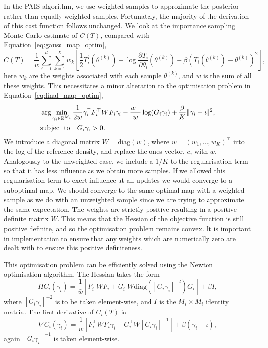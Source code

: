 \documentclass[final]{siamltex}
\begin{document}
In the PAIS algorithm, we use weighted samples to approximate the posterior rather than equally weighted samples. Fortunately, the majority of the derivation of this cost function follows unchanged. We look at the importance sampling Monte Carlo estimate of $C(T)$, compared with
Equation~\eqref{eq:gauss_map_optim},
\begin{equation}\label{eqn:TPAIS_objective}
	C(T) = \frac{1}{\bar{w}}\sum\limits_{i=1}^d \! \sum\limits_{k=1}^K
		w_k\left[\frac{1}{2}T_i^2(\theta^{(k)}) - \log\frac{\partial
		T_i}{\partial\theta_i}(\theta^{(k)}) + \beta(T_i(\theta^{(k)})-\theta^{(k)})^2\right],
\end{equation}
here $w_k$ are the weights associated with each sample $\theta^{(k)}$, and $\bar{w}$ is the sum of
all these weights. This necessitates a minor alteration to the optimisation problem in
Equation~\eqref{eq:final_map_optim},
\begin{align}\label{eq:weighted_map_optim}
	&\arg\min_{\gamma_i\in\mathbb{R}^{M_i}} \frac{1}{2\bar{w}}\gamma_i^\top F_i^\top WF_i\gamma_i -
		\frac{w^\top}{\bar{w}}\log(G_i\gamma_i) + \frac{\beta}{K}\|\gamma_i-\iota\|^2, \\
	&\text{subject to} \quad G_i\gamma_i > 0. \notag
\end{align}
We introduce a diagonal matrix $W = \text{diag}(w)$, where $w = (w_1,\dots,w_K)^\top$ into the log of the reference density, and replace the ones vector, $c$, with $w$. Analogously to the unweighted case, we include a $1/K$ to the regularisation term so that it has less influence as we obtain more samples. If we allowed this regularisation term to exert influence at all updates we would converge to a suboptimal map. We should converge to the same optimal map with a weighted sample as we do with an unweighted sample since we are trying to approximate the same expectation. The weights are strictly
positive resulting in a positive definite matrix $W$. This means that the Hessian of the objective
function is still positive definite, and so the optimisation problem remains convex. It is important in implementation to ensure that any weights which are numerically zero are dealt with to ensure this positive definiteness.

This optimisation problem can be efficiently solved using the Newton optimisation algorithm. The Hessian takes the
form
\begin{equation}\label{eqn:TPAIS_hessian}
	HC_i(\gamma_i) = \frac{1}{\bar{w}}\left[F_i^\top WF_i + G_i^\top
		W\text{diag}([G_i\gamma_i]^{-2})G_i\right] + \beta I,
\end{equation}
where $[G_i\gamma_i]^{-2}$ is to be taken element-wise, and $I$ is the $M_i\times M_i$
identity matrix. The first derivative of $C_i(T)$ is
\[
	\nabla C_i(\gamma_i) = \frac{1}{\bar{w}}\left[F_i^\top WF_i\gamma_i - G_i^\top
		W[G_i\gamma_i]^{-1}\right] + \beta(\gamma_i - \iota),
\]
again $[G_i\gamma_i]^{-1}$ is taken element-wise.
\end{document}
